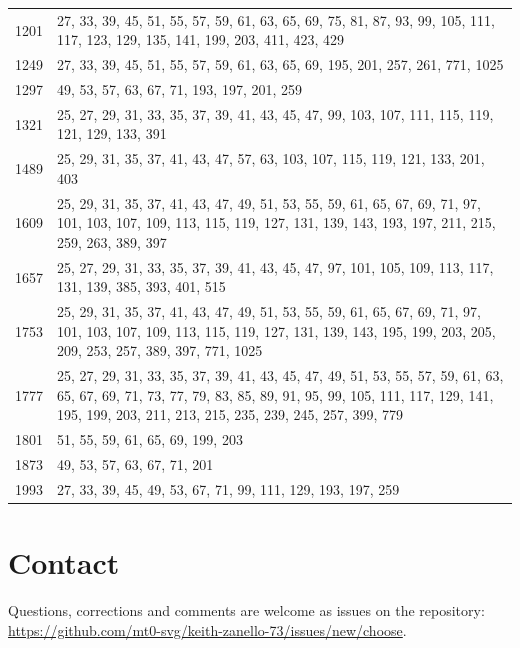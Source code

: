 \documentclass[12pt]{amsart}
\newcommand{\repo}{https://github.com/mt0-svg/keith-zanello-73}
\theoremstyle{definition}
\begin{document}
\begin{table}[ht]
\begin{tabular}{r p{}}
1201 & 27, 33, 39, 45, 51, 55, 57, 59, 61, 63, 65, 69, 75, 81, 87, 93, 99, 105, 111, 117, 123, 129, 135, 141, 199, 203, 411, 423, 429\\
1249 & 27, 33, 39, 45, 51, 55, 57, 59, 61, 63, 65, 69, 195, 201, 257, 261, 771, 1025\\
1297 & 49, 53, 57, 63, 67, 71, 193, 197, 201, 259\\
1321 & 25, 27, 29, 31, 33, 35, 37, 39, 41, 43, 45, 47, 99, 103, 107, 111, 115, 119, 121, 129, 133, 391\\
1489 & 25, 29, 31, 35, 37, 41, 43, 47, 57, 63, 103, 107, 115, 119, 121, 133, 201, 403\\
1609 & 25, 29, 31, 35, 37, 41, 43, 47, 49, 51, 53, 55, 59, 61, 65, 67, 69, 71, 97, 101, 103, 107, 109, 113, 115, 119, 127, 131, 139, 143, 193, 197, 211, 215, 259, 263, 389, 397\\
1657 & 25, 27, 29, 31, 33, 35, 37, 39, 41, 43, 45, 47, 97, 101, 105, 109, 113, 117, 131, 139, 385, 393, 401, 515\\
1753 & 25, 29, 31, 35, 37, 41, 43, 47, 49, 51, 53, 55, 59, 61, 65, 67, 69, 71, 97, 101, 103, 107, 109, 113, 115, 119, 127, 131, 139, 143, 195, 199, 203, 205, 209, 253, 257, 389, 397, 771, 1025\\
1777 & 25, 27, 29, 31, 33, 35, 37, 39, 41, 43, 45, 47, 49, 51, 53, 55, 57, 59, 61, 63, 65, 67, 69, 71, 73, 77, 79, 83, 85, 89, 91, 95, 99, 105, 111, 117, 129, 141, 195, 199, 203, 211, 213, 215, 235, 239, 245, 257, 399, 779\\
1801 & 51, 55, 59, 61, 65, 69, 199, 203\\
1873 & 49, 53, 57, 63, 67, 71, 201\\
1993 & 27, 33, 39, 45, 49, 53, 67, 71, 99, 111, 129, 193, 197, 259\\
\hline
\end{tabular}
\end{table}

\section*{Contact}
Questions, corrections and comments are welcome as issues on the repository: \url{\repo/issues/new/choose}.
\end{document}
